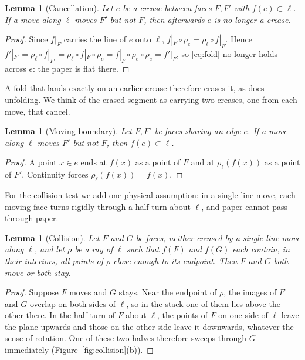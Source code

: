 \documentclass[11pt]{article}
\newtheorem{lemma}[theorem]{Lemma}
\theoremstyle{definition}
\theoremstyle{remark}
\begin{document}
\begin{lemma}[Cancellation]\label{lem:cancel}
Let $e$ be a crease between faces $F,F'$ with $f(e)\subset\ell$. If a move along $\ell$ moves $F'$ but not $F$, then afterwards $e$ is no longer a crease.
\end{lemma}

\begin{proof}
Since $f|_F$ carries the line of $e$ onto $\ell$, $f|_F\circ\rho_e=\rho_\ell\circ f|_F$. Hence $f'|_{F'}=\rho_\ell\circ f|_{F'}=\rho_\ell\circ f|_F\circ\rho_e=f|_F\circ\rho_e\circ\rho_e=f'|_F$, so \eqref{eq:fold} no longer holds across $e$: the paper is flat there.
\end{proof}

A fold that lands exactly on an earlier crease therefore erases it, as does unfolding. We think of the erased segment as carrying two creases, one from each move, that cancel.

\begin{lemma}[Moving boundary]\label{lem:boundary}
Let $F,F'$ be faces sharing an edge $e$. If a move along $\ell$ moves $F'$ but not $F$, then $f(e)\subset\ell$.
\end{lemma}

\begin{proof}
A point $x\in e$ ends at $f(x)$ as a point of $F$ and at $\rho_\ell(f(x))$ as a point of $F'$. Continuity forces $\rho_\ell(f(x))=f(x)$.
\end{proof}

For the collision test we add one physical assumption: in a single-line move, each moving face turns rigidly through a half-turn about $\ell$, and paper cannot pass through paper.

\begin{lemma}[Collision]\label{lem:collision}
Let $F$ and $G$ be faces, neither creased by a single-line move along $\ell$, and let $\rho$ be a ray of $\ell$ such that $f(F)$ and $f(G)$ each contain, in their interiors, all points of $\rho$ close enough to its endpoint. Then $F$ and $G$ both move or both stay.
\end{lemma}

\begin{proof}
Suppose $F$ moves and $G$ stays. Near the endpoint of $\rho$, the images of $F$ and $G$ overlap on both sides of $\ell$, so in the stack one of them lies above the other there. In the half-turn of $F$ about $\ell$, the points of $F$ on one side of $\ell$ leave the plane upwards and those on the other side leave it downwards, whatever the sense of rotation. One of these two halves therefore sweeps through $G$ immediately (Figure~\ref{fig:collision}(b)).
\end{proof}
\end{document}
